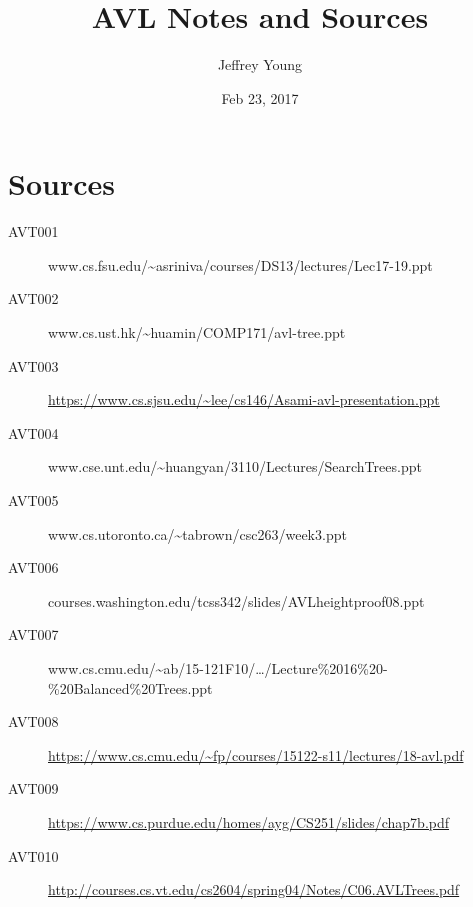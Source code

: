 \documentclass[10pt, letterpaper]{article}
\author{Jeffrey Young}
\date{Feb 23, 2017}
\title{AVL Notes and Sources}
\begin{document}
\maketitle

\section*{Sources}
\label{sec:org5cd4c8d}
\begin{description}
\item[{AVT001}] www.cs.fsu.edu/\textasciitilde{}asriniva/courses/DS13/lectures/Lec17-19.ppt
\item[{AVT002}] www.cs.ust.hk/\textasciitilde{}huamin/COMP171/avl-tree.ppt
\item[{AVT003}] \url{https://www.cs.sjsu.edu/\~lee/cs146/Asami-avl-presentation.ppt}
\item[{AVT004}] www.cse.unt.edu/\textasciitilde{}huangyan/3110/Lectures/SearchTrees.ppt
\item[{AVT005}] www.cs.utoronto.ca/\textasciitilde{}tabrown/csc263/week3.ppt
\item[{AVT006}] courses.washington.edu/tcss342/slides/AVLheightproof08.ppt
\item[{AVT007}] www.cs.cmu.edu/\textasciitilde{}ab/15-121F10/\ldots{}/Lecture\%2016\%20-\%20Balanced\%20Trees.ppt
\item[{AVT008}] \url{https://www.cs.cmu.edu/\~fp/courses/15122-s11/lectures/18-avl.pdf}
\item[{AVT009}] \url{https://www.cs.purdue.edu/homes/ayg/CS251/slides/chap7b.pdf}
\item[{AVT010}] \url{http://courses.cs.vt.edu/cs2604/spring04/Notes/C06.AVLTrees.pdf}
\end{description}
\end{document}
